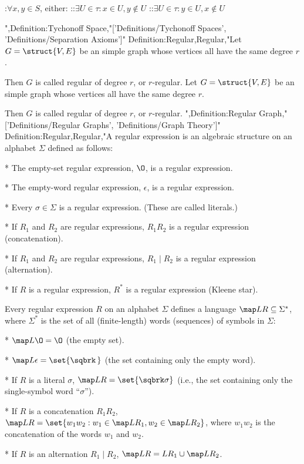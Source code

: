 :$\forall x, y \in S$, either:
::$\exists U \in \tau: x \in U, y \notin U$
::$\exists U \in \tau: y \in U, x \notin U$


",Definition:Tychonoff Space,"['Definitions/Tychonoff Spaces', 'Definitions/Separation Axioms']"
Definition:Regular,Regular,"Let $G = \struct {V, E}$ be an simple graph whose vertices all have the same degree $r$.

Then $G$ is called regular of degree $r$, or $r$-regular.
Let $G = \struct {V, E}$ be an simple graph whose vertices all have the same degree $r$.

Then $G$ is called regular of degree $r$, or $r$-regular.
",Definition:Regular Graph,"['Definitions/Regular Graphs', 'Definitions/Graph Theory']"
Definition:Regular,Regular,"A regular expression is an algebraic structure on an alphabet $\Sigma$ defined as follows:

* The empty-set regular expression, $\O$, is a regular expression.

* The empty-word regular expression, $\epsilon$, is a regular expression.

* Every $\sigma \in \Sigma$ is a regular expression. (These are called literals.)

* If $R_1$ and $R_2$ are regular expressions, $R_1 R_2$ is a regular expression (concatenation).

* If $R_1$ and $R_2$ are regular expressions, $R_1 \mid R_2$ is a regular expression (alternation).

* If $R$ is a regular expression, $R^*$ is a regular expression (Kleene star).


Every regular expression $R$ on an alphabet $\Sigma$ defines a language $\map L R \subseteq \Sigma^*$, where $\Sigma^*$ is the set of all (finite-length) words (sequences) of symbols in $\Sigma$:

* $\map L \O = \O$ (the empty set).

* $\map L \epsilon = \set {\sqbrk \,}$ (the set containing only the empty word).

* If $R$ is a literal $\sigma$, $\map L R = \set {\sqbrk \sigma}$ (i.e., the set containing only the single-symbol word “$\sigma$”).

* If $R$ is a concatenation $R_1 R_2$, $\map L R = \set {w_1 w_2: w_1 \in \map L {R_1}, w_2 \in \map L {R_2} }$, where $w_1 w_2$ is the concatenation of the words $w_1$ and $w_2$.

* If $R$ is an alternation $R_1 \mid R_2$, $\map L R = L {R_1} \cup \map L {R_2}$.

